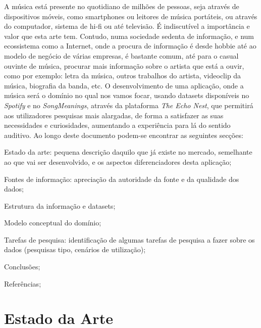 \documentclass[twocolumn,twoside,11pt,a4paper]{article}
\begin{document}
A música está presente no quotidiano de milhões de pessoas, seja através de
dispositivos móveis, como smartphones ou leitores de música portáteis, ou através do
computador, sistema de hi-fi ou até televisão. É indiscutível a importância e valor
que esta arte tem.
Contudo, numa sociedade sedenta de informação, e num ecossistema como a Internet, onde
a procura de informação é desde hobbie até ao modelo de negócio de várias empresas,
é bastante comum, até para o casual ouvinte de música, procurar mais informação
sobre o artista que está a ouvir, como por exemplo: letra da música, outros trabalhos
do artista, videoclip da música, biografia da banda, etc.
O desenvolvimento de uma aplicação, onde a música será o domínio no qual nos vamos
focar, usando datasets disponíveis no \textit{Spotify} e no \textit{SongMeanings},
através da plataforma \textit{The Echo Nest}, que permitirá aos utilizadores pesquisas
mais alargadas, de forma a satisfazer as suas necessidades e curiosidades, aumentando a
experiência para lá do sentido auditivo.
Ao longo deste documento podem-se encontrar as seguintes secções:
\begin{compactitem}
  \item Estado da arte: pequena descrição daquilo que já existe no mercado, semelhante
    ao que vai ser desenvolvido, e os aspectos diferenciadores desta aplicação;
  \item Fontes de informação: apreciação da autoridade da fonte e da qualidade dos
    dados;
  \item Estrutura da informação e datasets;
  \item Modelo conceptual do domínio;
  \item Tarefas de pesquisa: identificação de algumas tarefas de pesquisa a fazer sobre
    os dados (pesquisas tipo, cenários de utilização);
  \item Conclusões;
  \item Referências;
\end{compactitem}


\section{Estado da Arte}\label{sec:art}
\end{document}
